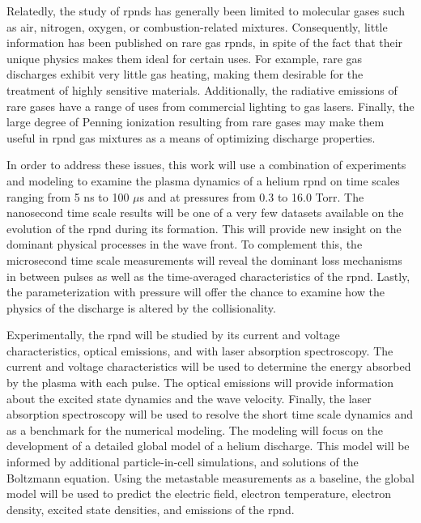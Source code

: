 Relatedly, the study of \acs{rpnd}s has generally been limited to molecular
gases such as air, nitrogen, oxygen, or combustion-related mixtures.
Consequently, little information has been published on rare gas \acs{rpnd}s, in
spite of the fact that their unique physics makes them ideal for certain uses.
For example, rare gas discharges exhibit very little gas heating, making them
desirable for the treatment of highly sensitive materials. Additionally, the
radiative emissions of rare gases have a range of uses from commercial lighting
to gas lasers. Finally, the large degree of Penning ionization resulting from
rare gases may make them useful in \acs{rpnd} gas mixtures as a means of
optimizing discharge properties.

In order to address these issues, this work will use a combination of
experiments and modeling to examine the plasma dynamics of a helium \acs{rpnd}
on time scales ranging from 5 ns to 100 $\mu$s and at pressures from 0.3 to 16.0
Torr. The nanosecond time scale results will be one of a very few datasets
available on the evolution of the \acs{rpnd} during its formation. This will
provide new insight on the dominant physical processes in the wave front. To
complement this, the microsecond time scale measurements will reveal the
dominant loss mechanisms in between pulses as well as the time-averaged
characteristics of the \acs{rpnd}. Lastly, the parameterization with pressure
will offer the chance to examine how the physics of the discharge is altered by
the collisionality.

Experimentally, the \acs{rpnd} will be studied by its current and voltage
characteristics, optical emissions, and with laser absorption spectroscopy. The
current and voltage characteristics will be used to determine the energy
absorbed by the plasma with each pulse. The optical emissions will provide
information about the excited state dynamics and the wave velocity. Finally, the
laser absorption spectroscopy will be used to resolve the short time scale
dynamics and as a benchmark for the numerical modeling. The modeling will focus
on the development of a detailed global model of a helium discharge. This model
will be informed by additional particle-in-cell simulations, and solutions of
the Boltzmann equation. Using the metastable measurements as a baseline, the
global model will be used to predict the electric field, electron temperature,
electron density, excited state densities, and emissions of the \acs{rpnd}.
